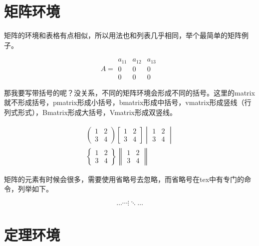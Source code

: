 \section{矩阵环境}
矩阵的环境和表格有点相似，所以用法也和列表几乎相同，举个最简单的矩阵例子。
\begin{codeshow}
\[
A=\begin{matrix}
a_{11} & a_{12} & a_{13}\\
0 & 0 & 0\\
0 & 0 & 0
\end{matrix}
\]
\end{codeshow}

那我要写带括号的呢？没关系，不同的矩阵环境会形成不同的括号。这里的matrix就不形成括号，pmatrix形成小括号，bmatrix形成中括号，vmatrix形成竖线（行列式形式），Bmatrix形成大括号，Vmatrix形成双竖线。
\begin{codeshow}
\begin{gather*}
    \begin{pmatrix}1 & 2\\
    3 & 4\end{pmatrix}
    \begin{bmatrix}1 & 2\\
    3 & 4\end{bmatrix}
    \begin{vmatrix}1 & 2\\
    3 & 4\end{vmatrix}\\
    \begin{Bmatrix}1 & 2\\
    3 & 4\end{Bmatrix}
    \begin{Vmatrix}1 & 2\\
    3 & 4\end{Vmatrix}
\end{gather*}
\end{codeshow}

矩阵的元素有时候会很多，需要使用省略号去忽略，而省略号在tex中有专门的命令，列举如下。
\begin{codeshow}
\[
\ldots \cdots \vdots \ddots \dotsc
\]
\end{codeshow}




\section{定理环境}